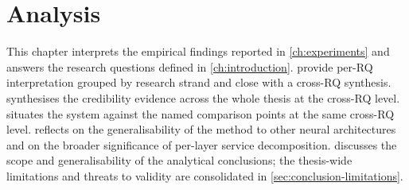 \chapter{Analysis}%
\label{ch:analysis}

This chapter interprets the empirical findings reported in
\cref{ch:experiments} and answers the research questions defined in
\cref{ch:introduction}.  provide per-RQ interpretation grouped by research
strand and close with a cross-RQ synthesis. 
synthesises the credibility evidence across the whole thesis at the cross-RQ
level.  situates the system against the named
comparison points at the same cross-RQ level.
 reflects on the generalisability of the method
to other neural architectures and on the broader significance of per-layer
service decomposition. 
discusses the scope and generalisability of the analytical conclusions; the
thesis-wide limitations and threats to validity are consolidated in
\cref{sec:conclusion-limitations}.








